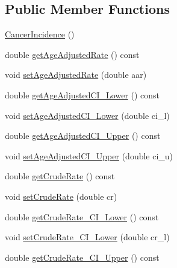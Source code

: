 \subsection*{Public Member Functions}
\begin{DoxyCompactItemize}
\item 
\mbox{\hyperlink{classbridges_1_1dataset_1_1_cancer_incidence_a2a6314af5704aa8f9f962738e12cd9dc}{Cancer\+Incidence}} ()
\item 
double \mbox{\hyperlink{classbridges_1_1dataset_1_1_cancer_incidence_abb8b465d513b8e7113c0dda4f1381b36}{get\+Age\+Adjusted\+Rate}} () const
\item 
void \mbox{\hyperlink{classbridges_1_1dataset_1_1_cancer_incidence_a435d5bd5a9c8680c3e2c94c8b7fad79f}{set\+Age\+Adjusted\+Rate}} (double aar)
\item 
double \mbox{\hyperlink{classbridges_1_1dataset_1_1_cancer_incidence_aacd1d64c111c166bfdfc022c03276d16}{get\+Age\+Adjusted\+C\+I\+\_\+\+Lower}} () const
\item 
void \mbox{\hyperlink{classbridges_1_1dataset_1_1_cancer_incidence_ac747ae48aa5619cb41d8296420eb3925}{set\+Age\+Adjusted\+C\+I\+\_\+\+Lower}} (double ci\+\_\+l)
\item 
double \mbox{\hyperlink{classbridges_1_1dataset_1_1_cancer_incidence_aa4c0975807e67227388f23fbf92e0867}{get\+Age\+Adjusted\+C\+I\+\_\+\+Upper}} () const
\item 
void \mbox{\hyperlink{classbridges_1_1dataset_1_1_cancer_incidence_a7cece904f540224984518679bc4ae544}{set\+Age\+Adjusted\+C\+I\+\_\+\+Upper}} (double ci\+\_\+u)
\item 
double \mbox{\hyperlink{classbridges_1_1dataset_1_1_cancer_incidence_aee79da5ad2ce63e44f4400276cc78f63}{get\+Crude\+Rate}} () const
\item 
void \mbox{\hyperlink{classbridges_1_1dataset_1_1_cancer_incidence_ad9bcbee58cbcb2b23d50f78e034faeb3}{set\+Crude\+Rate}} (double cr)
\item 
double \mbox{\hyperlink{classbridges_1_1dataset_1_1_cancer_incidence_a66d6a4f6a977c04480610d7fc7c7093b}{get\+Crude\+Rate\+\_\+\+C\+I\+\_\+\+Lower}} () const
\item 
void \mbox{\hyperlink{classbridges_1_1dataset_1_1_cancer_incidence_af75985ca4df5b0138312128580281cd8}{set\+Crude\+Rate\+\_\+\+C\+I\+\_\+\+Lower}} (double cr\+\_\+l)
\item 
double \mbox{\hyperlink{classbridges_1_1dataset_1_1_cancer_incidence_a173b07266305744cac5f853cac7a089e}{get\+Crude\+Rate\+\_\+\+C\+I\+\_\+\+Upper}} () const

\end{DoxyCompactItemize}
